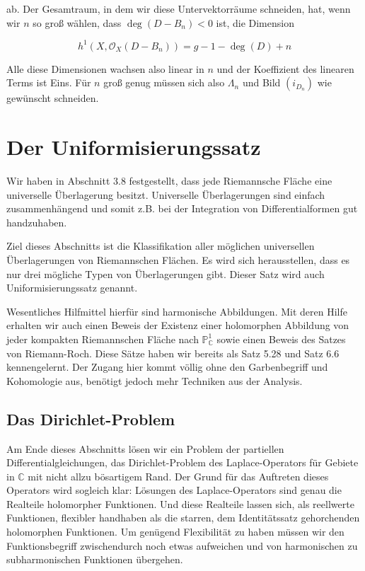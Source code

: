 \documentclass[10pt, letterpaper]{article}
\begin{document}
ab. Der Gesamtraum, in dem wir diese Untervektorräume schneiden, hat, wenn wir $n$ so groß wählen, dass $\operatorname{deg}\left(D-B_{n}\right)<0$ ist, die Dimension

$$
h^{1}\left(X, \mathcal{O}_{X}\left(D-B_{n}\right)\right)=g-1-\operatorname{deg}(D)+n
$$

Alle diese Dimensionen wachsen also linear in $n$ und der Koeffizient des linearen Terms ist Eins. Für $n$ groß genug müssen sich also $\Lambda_{n}$ und Bild $\left(i_{D_{n}}\right)$ wie gewünscht schneiden.

\section {Der Uniformisierungssatz}
Wir haben in Abschnitt 3.8 festgestellt, dass jede Riemannsche Fläche eine universelle Überlagerung besitzt. Universelle Überlagerungen sind einfach zusammenhängend und somit z.B. bei der Integration von Differentialformen gut handzuhaben.

Ziel dieses Abschnitts ist die Klassifikation aller möglichen universellen Überlagerungen von Riemannschen Flächen. Es wird sich herausstellen, dass es nur drei mögliche Typen von Überlagerungen gibt. Dieser Satz wird auch Uniformisierungssatz genannt.

Wesentliches Hilfmittel hierfür sind harmonische Abbildungen. Mit deren Hilfe erhalten wir auch einen Beweis der Existenz einer holomorphen Abbildung von jeder kompakten Riemannschen Fläche nach $\mathbb{P}_{\mathbb{C}}^{1}$ sowie einen Beweis des Satzes von Riemann-Roch. Diese Sätze haben wir bereits als Satz 5.28 und Satz 6.6 kennengelernt. Der Zugang hier kommt völlig ohne den Garbenbegriff und Kohomologie aus, benötigt jedoch mehr Techniken aus der Analysis.

\subsection {Das Dirichlet-Problem}
Am Ende dieses Abschnitts lösen wir ein Problem der partiellen Differentialgleichungen, das Dirichlet-Problem des Laplace-Operators für Gebiete in $\mathbb{C}$ mit nicht allzu bösartigem Rand. Der Grund für das Auftreten dieses Operators wird sogleich klar: Lösungen des Laplace-Operators sind genau die Realteile holomorpher Funktionen. Und diese Realteile lassen sich, als reellwerte Funktionen, flexibler handhaben als die starren, dem Identitätssatz gehorchenden holomorphen Funktionen. Um genügend Flexibilität zu haben müssen wir den Funktionsbegriff zwischendurch noch etwas aufweichen und von harmonischen zu subharmonischen Funktionen übergehen.
\end{document}
